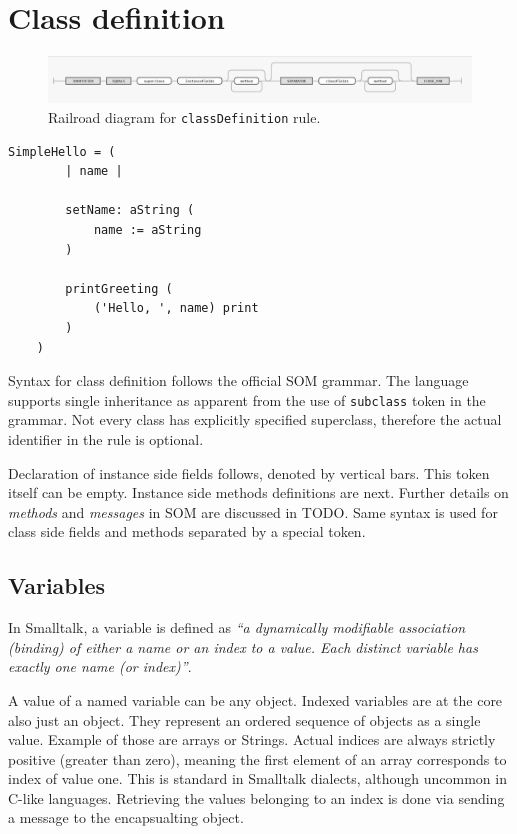 \documentclass[thesis=M,english]{FITthesis}[2019/12/23]
\begin{document}
\section{Class definition}
\begin{figure}[h!]
	\centering
	\includegraphics[width=\textwidth]{media/grammar/classDefinition_rrd.png}
	\caption{Railroad diagram for \texttt{classDefinition} rule.}
	\label{fig:classDefinition_rrd}
\end{figure}

\begin{lstlisting}[language=Smalltalk]
	SimpleHello = (
		| name |

		setName: aString (
			name := aString
		)

		printGreeting (
			('Hello, ', name) print
		)
	)
\end{lstlisting}

Syntax for class definition follows the official SOM grammar. The language supports single inheritance as apparent from the use
of \texttt{subclass} token in the grammar. Not every class has explicitly specified superclass, therefore the actual identifier in
the rule is optional.

Declaration of instance side fields follows, denoted by vertical bars. This token itself can be empty. Instance side methods definitions
are next. Further details on \textit{methods} and \textit{messages} in SOM are discussed in TODO. %
Same syntax is used for class side fields and methods separated by a special token.

\subsection{Variables}
In Smalltalk, a variable is defined as \textit{``a dynamically modifiable association (binding) of either a name
or an index to a value. Each distinct variable has exactly one name (or index)''}\cite{smalltalk-essentials}.

A value of a named variable can be any object. Indexed variables are at the core also just an object. They
represent an ordered sequence of objects as a single value. Example of those are arrays or Strings. Actual
indices are always strictly positive (greater than zero), meaning the first element of an array corresponds
to index of value one. This is standard in Smalltalk dialects, although uncommon in C-like languages. Retrieving
the values belonging to an index is done via sending a message to the encapsualting object.
\end{document}
